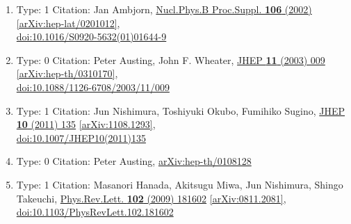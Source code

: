\documentclass[a4paper,10pt]{article}
\begin{document}
\begin{enumerate}
\begin{enumerate}
  \item Type: 1 Citation: Jan Ambjorn, \href{https://www.doi.org/10.1016/S0920-5632(01)01644-9}{Nucl.Phys.B Proc.Suppl. {\bf 106} (2002) }  \href{https://arxiv.org/abs/hep-lat/0201012}{[arXiv:hep-lat/0201012]},\\\href{https://www.doi.org/10.1016/S0920-5632(01)01644-9}{doi:10.1016/S0920-5632(01)01644-9}
  \item Type: 0 Citation: Peter Austing, John F. Wheater, \href{https://www.doi.org/10.1088/1126-6708/2003/11/009}{JHEP {\bf 11} (2003) 009}  \href{https://arxiv.org/abs/hep-th/0310170}{[arXiv:hep-th/0310170]},\\\href{https://www.doi.org/10.1088/1126-6708/2003/11/009}{doi:10.1088/1126-6708/2003/11/009}
  \item Type: 1 Citation: Jun Nishimura, Toshiyuki Okubo, Fumihiko Sugino, \href{https://www.doi.org/10.1007/JHEP10(2011)135}{JHEP {\bf 10} (2011) 135}  \href{https://arxiv.org/abs/1108.1293}{[arXiv:1108.1293]},\\\href{https://www.doi.org/10.1007/JHEP10(2011)135}{doi:10.1007/JHEP10(2011)135}
  \item Type: 0 Citation: Peter Austing, \href{https://arxiv.org/abs/hep-th/0108128}{arXiv:hep-th/0108128}
  \item Type: 1 Citation: Masanori Hanada, Akitsugu Miwa, Jun Nishimura, Shingo Takeuchi, \href{https://www.doi.org/10.1103/PhysRevLett.102.181602}{Phys.Rev.Lett. {\bf 102} (2009) 181602}  \href{https://arxiv.org/abs/0811.2081}{[arXiv:0811.2081]},\\\href{https://www.doi.org/10.1103/PhysRevLett.102.181602}{doi:10.1103/PhysRevLett.102.181602}

\end{enumerate}
\end{enumerate}
\end{document}
